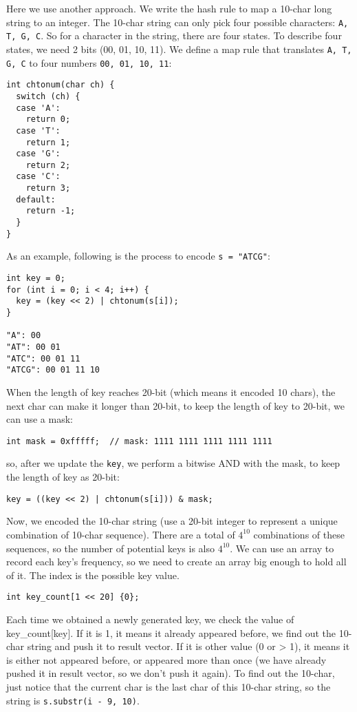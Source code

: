 \documentclass[12pt]{article}
\begin{document}
Here we use another approach. We write the hash rule to map a 10-char long string to an integer. The 10-char string can only pick four possible characters: \texttt{A, T, G, C}. So for a character in the string, there are four states. To describe four states, we need 2 bits (00, 01, 10, 11). We define a map rule that translates \texttt{A, T, G, C} to four numbers \texttt{00, 01, 10, 11}:
\begin{verbatim}
int chtonum(char ch) {
  switch (ch) {
  case 'A':
    return 0;
  case 'T':
    return 1;
  case 'G':
    return 2;
  case 'C':
    return 3;
  default:
    return -1;
  }
}
\end{verbatim}

As an example, following is the process to encode \texttt{s = "ATCG"}:
\begin{verbatim}
int key = 0;
for (int i = 0; i < 4; i++) {
  key = (key << 2) | chtonum(s[i]);
}

"A": 00
"AT": 00 01
"ATC": 00 01 11
"ATCG": 00 01 11 10 
\end{verbatim}

When the length of key reaches 20-bit (which means it encoded 10 chars), the next char can make it longer than 20-bit, to keep the length of key to 20-bit, we can use a mask:
\begin{verbatim}
int mask = 0xfffff;  // mask: 1111 1111 1111 1111 1111
\end{verbatim}
so, after we update the \texttt{key}, we perform a bitwise AND with the mask, to keep the length of key as 20-bit:
\begin{verbatim}
key = ((key << 2) | chtonum(s[i])) & mask;
\end{verbatim}

Now, we encoded the 10-char string (use a 20-bit integer to represent a unique combination of 10-char sequence). There are a total of \(4^10\) combinations of these sequences, so the number of potential keys is also \(4^10\). We can use an array to record each key's frequency, so we need to create an array big enough to hold all of it. The index is the possible key value.
\begin{verbatim}
int key_count[1 << 20] {0};
\end{verbatim}

Each time we obtained a newly generated key, we check the value of key\_count[key]. If it is 1, it means it already appeared before, we find out the 10-char string and push it to result vector. If it is other value (0 or > 1), it means it is either not appeared before, or appeared more than once (we have already pushed it in result vector, so we don't push it again). To find out the 10-char, just notice that the current char is the last char of this 10-char string, so the string is \texttt{s.substr(i - 9, 10)}.
\end{document}
